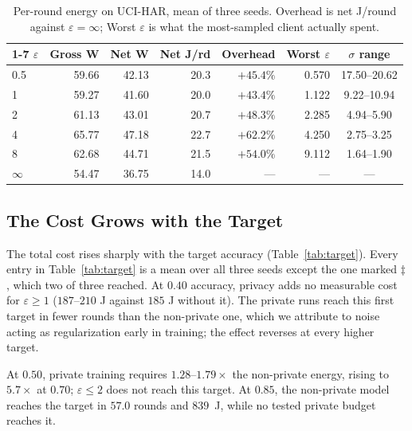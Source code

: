 \begin{table}[t]
\centering
\caption{Per-round energy on UCI-HAR, mean of three seeds. Overhead is net
J/round against $\varepsilon=\infty$; Worst $\varepsilon$ is what the
most-sampled client actually spent.}
\label{tab:perround}
\footnotesize
\setlength{\tabcolsep}{4.5pt}
\begin{tabular}{lrrrrrc}
\cline{1-7}
$\varepsilon$ & Gross W & Net W & Net J/rd & Overhead & Worst $\varepsilon$ & $\sigma$ range \\
\hline
0.5      & 59.66 & 42.13 & 20.3 & $+45.4\%$ & 0.570 & 17.50--20.62 \\
1        & 59.27 & 41.60 & 20.0 & $+43.4\%$ & 1.122 & 9.22--10.94 \\
2        & 61.13 & 43.01 & 20.7 & $+48.3\%$ & 2.285 & 4.94--5.90 \\
4        & 65.77 & 47.18 & 22.7 & $+62.2\%$ & 4.250 & 2.75--3.25 \\
8        & 62.68 & 44.71 & 21.5 & $+54.0\%$ & 9.112 & 1.64--1.90 \\
$\infty$ & 54.47 & 36.75 & 14.0 & ---       & ---   & --- \\
\hline
\end{tabular}
\end{table}

\subsection{The Cost Grows with the Target}

The total cost rises sharply with the target accuracy (Table~\ref{tab:target}). Every entry in Table~\ref{tab:target} is a mean over all three seeds except the one marked $\ddagger$, which two of three reached. At $0.40$ accuracy, privacy adds no measurable cost for $\varepsilon \geq 1$ ($187$--$210$ J against $185$ J without it). The private runs reach this first target in fewer rounds than the non-private one, which we attribute to noise acting as regularization early in training; the effect reverses at every higher target.

At $0.50$, private training requires $1.28$--$1.79\times$ the non-private energy, rising to $5.7\times$ at $0.70$; $\varepsilon \le 2$ does not reach this target. At $0.85$, the non-private model reaches the target in $57.0$ rounds and $839$~J, while no tested private budget reaches it.


